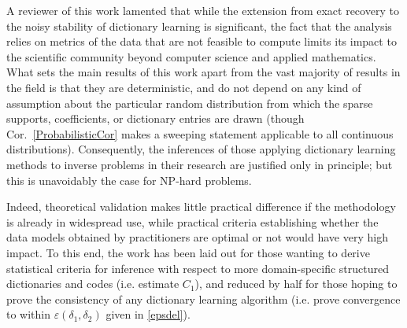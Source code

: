 
A reviewer of this work lamented that while the extension from exact recovery to the noisy stability of dictionary learning is significant, the fact that the analysis relies on metrics of the data that are not feasible to compute limits its impact to the scientific community beyond computer science and applied mathematics. What sets the main results of this work apart from the vast majority of results in the field is that they are deterministic, and do not depend on any kind of assumption about the particular random distribution from which the sparse supports, coefficients, or dictionary entries are drawn (though Cor.~\ref{ProbabilisticCor} makes a sweeping statement applicable to all continuous distributions). Consequently, the inferences of those applying dictionary learning methods to inverse problems in their research are justified only in principle; but this is unavoidably the case for NP-hard problems. 

Indeed, theoretical validation makes little practical difference if the methodology is already in widespread use, while practical criteria establishing whether the data models obtained by practitioners are optimal or not would have very high impact. To this end, the work has been laid out for those wanting to derive statistical criteria for inference with respect to more domain-specific structured dictionaries and codes (i.e. estimate $C_1$), and reduced by half for those hoping to prove the consistency of any dictionary learning algorithm (i.e. prove convergence to within $\varepsilon(\delta_1,\delta_2)$ given in \eqref{epsdel}). 

